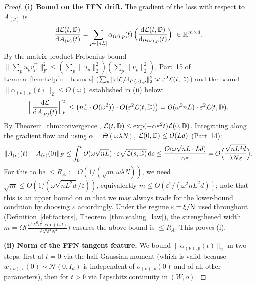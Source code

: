 \documentclass[11pt]{article}
\theoremstyle{plain}
\newcommand{\R}{\mathbb{R}}
\renewcommand{\d}{\mathrm{d}}
\begin{document}
\begin{proof}
    \textbf{(i) Bound on the FFN drift.} The gradient of the loss with respect to $A_{(\nu)}$ is
    \begin{align*}
        \frac{\d {\cal L}(t,\mathbb{D})}{\d A_{(\nu)}(t)} = \sum_{p\in[nL]} \alpha_{(\nu), p}(t)\,\Big(\frac{\d {\cal L}(t,\mathbb{D})}{\d \mu_{(\nu),p}(t)}\Big)^{\!\!\top} \in \R^{m\times d}.
    \end{align*}
    By the matrix-product Frobenius bound $\|\sum_p u_p v_p^\top\|_F^2 \le (\sum_p \|u_p\|_2^2)(\sum_p \|v_p\|_2^2)$, Part~15 of Lemma~\ref{lem:helpful_bounds} ($\sum_p \|\d{\cal L}/\d\mu_{(\nu),p}\|_2^2 \asymp \varepsilon^2 {\cal L}(t,\mathbb{D})$) and the bound $\|\alpha_{(\nu),p}(t)\|_2 \leq O(\omega)$ established in (ii) below:
    \begin{align*}
        \Big\|\frac{\d {\cal L}}{\d A_{(\nu)}(t)}\Big\|_F^2 \leq \big(nL\cdot O(\omega^2)\big)\cdot O\big(\varepsilon^2 {\cal L}(t,\mathbb{D})\big) = O(\omega^2 nL)\cdot \varepsilon^2 {\cal L}(t,\mathbb{D}).
    \end{align*}
    By Theorem~\ref{thm:convergence}, ${\cal L}(t,\mathbb{D}) \leq \exp(-\alpha\varepsilon^2 t){\cal L}(0,\mathbb{D})$. Integrating along the gradient flow and using $\alpha = \Theta(\omega\lambda N)$, ${\cal L}(0,\mathbb{D})\leq O(Ld)$ (Part~14):
    \begin{align*}
        \|A_{(\nu)}(t) - A_{(\nu)}(0)\|_F \leq \int_0^t O(\omega\sqrt{nL})\cdot\varepsilon\sqrt{{\cal L}(s,\mathbb{D})}\,\d s
        \leq \frac{O(\omega\sqrt{nL\cdot Ld})}{\alpha\varepsilon} = O\Big(\frac{\sqrt{nL^2d}}{\lambda N\varepsilon}\Big).
    \end{align*}
    For this to be $\le R_A := O(1/(\sqrt m\,\omega\lambda N))$, we need $\sqrt m \le O(1/(\omega\sqrt{nL^2d}/\varepsilon))$, equivalently $m \le O(\varepsilon^2/(\omega^2 nL^2d))$; note that this is an upper bound on $m$ that we may always trade for the lower-bound condition by choosing $\varepsilon$ accordingly. Under the regime $\varepsilon = \xi/{\sf N}$ used throughout (Definition~\ref{def:factors}, Theorem~\ref{thm:scaling_law}), the strengthened width $m = \Omega\big(\frac{n^4 L^6 d^2 \exp(Cd)}{\omega^6 \lambda^8 \delta^4 N^4}\big)$ ensures the above bound is $\le R_A$. This proves (i).

    \textbf{(ii) Norm of the FFN tangent feature.} We bound $\|\alpha_{(\nu),p}(t)\|_2$ in two steps: first at $t=0$ via the half-Gaussian moment (which is valid because $w_{(\nu),r}(0)\sim\mathcal{N}(0,I_d)$ is independent of $o_{(\nu),p}(0)$ and of all other parameters), then for $t>0$ via Lipschitz continuity in $(W, o)$.


\end{proof}
\end{document}
